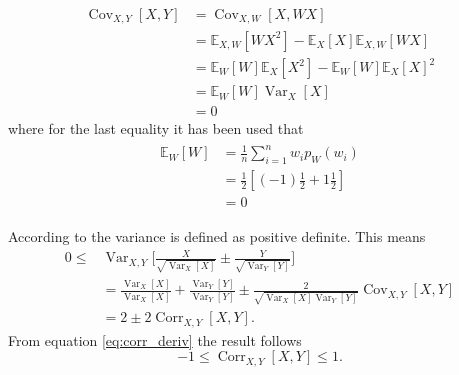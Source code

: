 \begin{example}
\begin{enumerate}
		\begin{equation}
			\begin{split}
				\operatorname{Cov}_{X,Y}[X,Y] &= \operatorname{Cov}_{X,W}[X,WX] \\
				&= \mathbb{E}_{X,W}[WX^2]-\mathbb{E}_X[X]\mathbb{E}_{X,W}[WX]\\
				&= \mathbb{E}_W[W]\mathbb{E}_X[X^2]-\mathbb{E}_W[W]\mathbb{E}_X[X]^2\\
				&= \mathbb{E}_W[W]\operatorname{Var}_X[X]\\
				& = 0
			\end{split}
		\end{equation}
		where for the last equality it has been used that
		\begin{equation}
			\begin{split}
				\begin{split}
					\mathbb{E}_W[W]&= \frac{1}{n}\sum_{i=1}^nw_ip_W(w_i)\\
					&= \frac{1}{2}[(-1)\frac{1}{2}+1\frac{1}{2}]\\
					&= 0
				\end{split}
			\end{split}
		\end{equation}
		
	\end{enumerate}
	
\end{example}

\begin{example}
	According to  the variance is defined as positive definite. This means
	\begin{equation}
		\label{eq:corr_deriv}
		\begin{split}
			0\leq& \operatorname{Var}_{X,Y}\bigg[\frac{X}{\sqrt{\operatorname{Var}_{X}[X]}}\pm\frac{Y}{\sqrt{\operatorname{Var}_{Y}[Y]}}\bigg]\\
			& = \frac{\operatorname{Var}_X[X]}{\operatorname{Var}_{X}[X]}+\frac{\operatorname{Var}_Y[Y]}{\operatorname{Var}_{Y}[Y]}\pm \frac{2}{\sqrt{\operatorname{Var}_{X}[X]\operatorname{Var}_{Y}[Y]}}\operatorname{Cov}_{X,Y}[X,Y]\\
			& = 2\pm 2\operatorname{Corr}_{X,Y}[X,Y].
		\end{split}
	\end{equation}
	 From equation \eqref{eq:corr_deriv} the result follows
	\begin{equation}
		-1\leq \operatorname{Corr}_{X,Y}[X,Y]\leq 1.
	\end{equation}	
\end{example}

